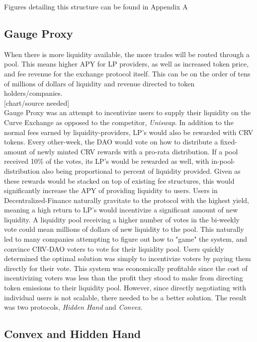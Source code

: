 \documentclass{article}
\begin{document}
Figures detailing this structure can be found in Appendix A

\subsection{Gauge Proxy}
When there is more liquidity available, the more trades will be routed through a pool. This means higher APY for LP providers, as well as increased token price, and fee revenue for the exchange protocol itself. This can be on the order of tens of millions of dollars of liquidity and revenue directed to token holders/companies.\\

[chart/source needed]\\

Gauge Proxy was an attempt to incentivize users to supply their liquidity on the Curve Exchange as opposed to the competitor, \emph{Uniswap}. In addition to the normal fees earned by liquidity-providers, LP's would also be rewarded with CRV tokens. Every other-week, the DAO would vote on how to distribute a fixed-amount of newly minted CRV rewards with a pro-rata distribution. If a pool received 10\% of the votes, its LP's would be rewarded as well, with in-pool-distribution also being proportional to percent of liquidity provided. Given as these rewards would be stacked on top of existing fee structures, this would significantly increase the APY of providing liquidity to users. Users in Decentralized-Finance naturally gravitate to the protocol with the highest yield, meaning a high return to LP's would incentivize a significant amount of new liquidity. A liquidity pool receiving a higher number of votes in the bi-weekly vote could mean millions of dollars of new liquidity to the pool. This naturally led to many companies attempting to figure out how to "game" the system, and convince CRV-DAO voters to vote for their liquidity pool. Users quickly determined the optimal solution was simply to incentivize voters by paying them directly for their vote. This system was economically profitable since the cost of incentivizing voters was less than the profit they stood to make from directing token emissions to their liquidity pool. However, since directly negotiating with individual users is not scalable, there needed to be a better solution. The result was two protocols, \emph{Hidden Hand} and \emph{Convex}.

\subsection{Convex and Hidden Hand}
\end{document}
